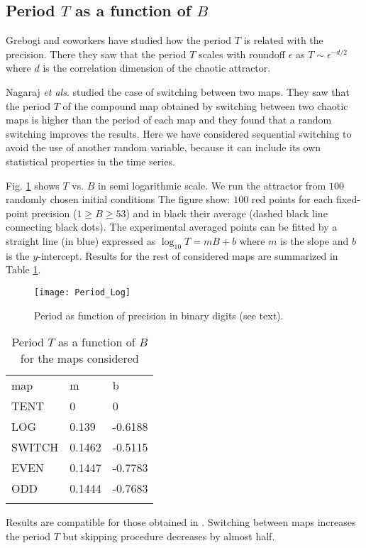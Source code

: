 \subsection{Period $T$ as a function of $B$}

Grebogi and coworkers \cite{Grebogi1988} have studied how the period $T$ is related with the precision.
There they saw that the period $T$ scales with roundoff $\epsilon$ as $T\sim\epsilon^{-d/2}$ where $d$ is the correlation dimension of the chaotic attractor.

Nagaraj \textit{et als}. \cite{Nagaraj2008} studied the case of switching between two maps.
They saw that the period $T$ of the compound map obtained by switching between two chaotic maps is higher than the period of each map and they found that a random switching improves the results.
Here we have considered sequential switching to avoid the use of another random variable, because it can include its own statistical properties in the time series.

Fig. \ref{fig:period} shows  $T$ vs. $B$ in semi logarithmic scale.
We run the attractor from $100$ randomly chosen initial conditions
The figure show: $100$ red points for each fixed-point precision ($1\geq B \geq 53$) and in black their average (dashed black line connecting black dots).
The experimental averaged points can be fitted by a straight line (in blue) expressed as $\log_10 T=m B + b$ where $m$ is the slope and $b$ is the $y$-intercept.
Results for the rest of considered maps are summarized in Table \ref{tabla:periodos}.

\begin{figure}[htpb]
\centering	
	\texttt{[image: Period\_Log]}
	\caption{Period as function of precision in binary digits (see text).}
	\label{fig:period}
\end{figure}

\begin{table}[htpb]
\centering	
	\caption{Period $T$ as a function of $B$ for the maps considered}
	\vspace{1em}
	\begin{tabular}{lll}
		\hline\noalign{\smallskip}
		map & m & b  \\
		\noalign{\smallskip}\hline\noalign{\smallskip}
		TENT&0 & 0 \\
		LOG &0.139 & -0.6188 \\
		SWITCH &0.1462 & -0.5115 \\
		EVEN &0.1447 & -0.7783 \\
		ODD &0.1444 & -0.7683 \\
		\noalign{\smallskip}\hline
	\end{tabular}
	\label{tabla:periodos}	
\end{table}

Results are compatible for those obtained in \cite{Nagaraj2008}.
Switching between maps increases the period $T$ but skipping procedure decreases by almost half.